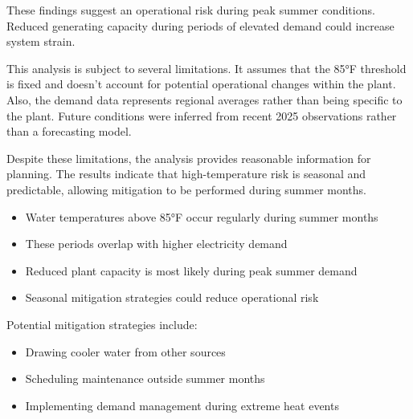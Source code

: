 \documentclass[
  letterpaper,
  DIV=11,
  numbers=noendperiod]{scrreprt}
\providecommand{\tightlist}{%
  \setlength{\itemsep}{0pt}\setlength{\parskip}{0pt}}
\begin{document}
These findings suggest an operational risk during peak summer
conditions. Reduced generating capacity during periods of elevated
demand could increase system strain.

This analysis is subject to several limitations. It assumes that the
85°F threshold is fixed and doesn't account for potential operational
changes within the plant. Also, the demand data represents regional
averages rather than being specific to the plant. Future conditions were
inferred from recent 2025 observations rather than a forecasting model.

Despite these limitations, the analysis provides reasonable information
for planning. The results indicate that high-temperature risk is
seasonal and predictable, allowing mitigation to be performed during
summer months.

\begin{tcolorbox}[enhanced jigsaw, colframe=quarto-callout-important-color-frame, opacityback=0, left=2mm, toprule=.15mm, bottomtitle=1mm, opacitybacktitle=0.6, coltitle=black, leftrule=.75mm, breakable, colback=white, titlerule=0mm, title=\textcolor{quarto-callout-important-color}{\faExclamation}\hspace{0.5em}{Executive Takeaways}, arc=.35mm, colbacktitle=quarto-callout-important-color!10!white, toptitle=1mm, bottomrule=.15mm, rightrule=.15mm]

\begin{itemize}
\tightlist
\item
  Water temperatures above 85°F occur regularly during summer months\\
\item
  These periods overlap with higher electricity demand\\
\item
  Reduced plant capacity is most likely during peak summer demand\\
\item
  Seasonal mitigation strategies could reduce operational risk
\end{itemize}

\end{tcolorbox}

Potential mitigation strategies include:

\begin{itemize}
\tightlist
\item
  Drawing cooler water from other sources\\
\item
  Scheduling maintenance outside summer months\\
\item
  Implementing demand management during extreme heat events
\end{itemize}
\end{document}
